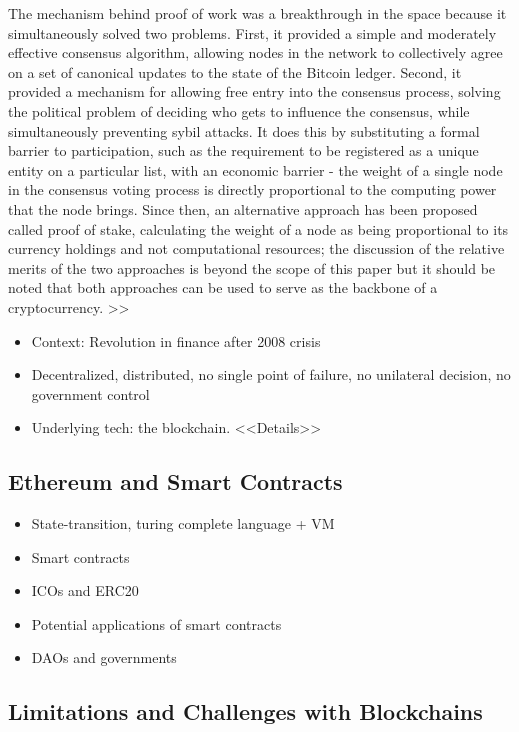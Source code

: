 \documentclass[a4paper]{article}
\begin{document}
The mechanism behind proof of work was a breakthrough in the space because it simultaneously solved two problems. First, it provided a simple and moderately effective consensus algorithm, allowing nodes in the network to collectively agree on a set of canonical updates to the state of the Bitcoin ledger. Second, it provided a mechanism for allowing free entry into the consensus process, solving the political problem of deciding who gets to influence the consensus, while simultaneously preventing sybil attacks. It does this by substituting a formal barrier to participation, such as the requirement to be registered as a unique entity on a particular list, with an economic barrier - the weight of a single node in the consensus voting process is directly proportional to the computing power that the node brings. Since then, an alternative approach has been proposed called proof of stake, calculating the weight of a node as being proportional to its currency holdings and not computational resources; the discussion of the relative merits of the two approaches is beyond the scope of this paper but it should be noted that both approaches can be used to serve as the backbone of a cryptocurrency.
>>

\begin{itemize}
\item Context: Revolution in finance after 2008 crisis
\item Decentralized, distributed, no single point of failure, no unilateral decision, no government control
\item Underlying tech: the blockchain. <<Details>>
\end{itemize}

\subsection{Ethereum and Smart Contracts}

\begin{itemize}
\item State-transition, turing complete language + VM
\item Smart contracts
\item ICOs and ERC20
\item Potential applications of smart contracts 
\item DAOs and governments
\end{itemize}

\subsection{Limitations and Challenges with Blockchains}
\end{document}
